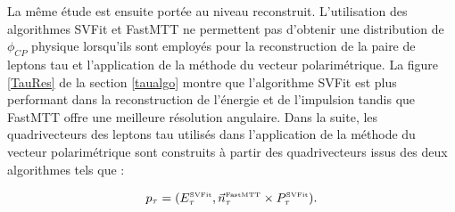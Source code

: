 La même étude est ensuite portée au niveau reconstruit. L'utilisation des algorithmes SVFit et FastMTT ne permettent pas d'obtenir une distribution de $\phi_{CP}$ physique lorsqu'ils sont employés pour la reconstruction de la paire de leptons tau et l'application de la méthode du vecteur polarimétrique. La figure \ref{TauRes} de la section \ref{taualgo} montre que l'algorithme SVFit est plus performant dans la reconstruction de l'énergie et de l'impulsion tandis que FastMTT offre une meilleure résolution angulaire. Dans la suite, les quadrivecteurs des leptons tau utilisés dans l'application de la méthode du vecteur polarimétrique sont construits à partir des quadrivecteurs issus des deux algorithmes tels que :  

\begin{equation}
    p_{\tau} = (E^{\text{\tiny SVFit}}_{\tau},\vec{n}_{\tau}^{\text{\tiny FastMTT}}\times P^{\text{\tiny SVFit}}_{\tau}).
\end{equation}

